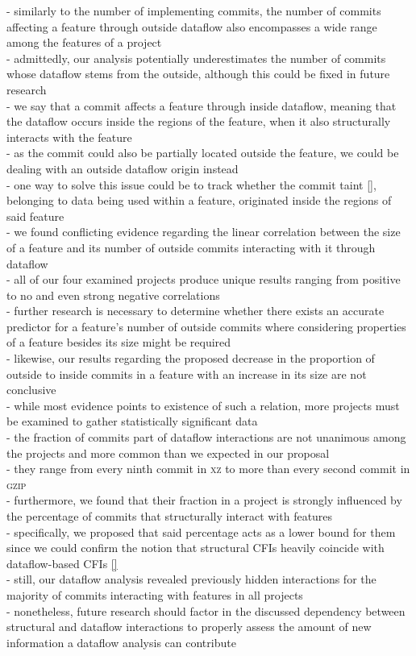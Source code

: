 - similarly to the number of implementing commits, the number of commits affecting a feature through outside dataflow also encompasses a wide range among the features of a project \\
- admittedly, our analysis potentially underestimates the number of commits whose dataflow stems from the outside, although this could be fixed in future research \\
- we say that a commit affects a feature through inside dataflow, meaning that the dataflow occurs inside the regions of the feature, when it also structurally interacts with the feature \\
- as the commit could also be partially located outside the feature, we could be dealing with an outside dataflow origin instead \\
- one way to solve this issue could be to track whether the commit taint \ref{}, belonging to data being used within a feature, originated inside the regions of said feature \\
- we found conflicting evidence regarding the linear correlation between the size of a feature and its number of outside commits interacting with it through dataflow \\
- all of our four examined projects produce unique results ranging from positive to no and even strong negative correlations \\
- further research is necessary to determine whether there exists an accurate predictor for a feature's number of outside commits where considering properties of a feature besides its size might be required \\
- likewise, our results regarding the proposed decrease in the proportion of outside to inside commits in a feature with an increase in its size are not conclusive \\
- while most evidence points to existence of such a relation, more projects must be examined to gather statistically significant data \\

- the fraction of commits part of dataflow interactions are not unanimous among the projects and more common than we expected in our proposal \\
- they range from every ninth commit in \textsc{xz} to more than every second commit in \textsc{gzip} \\
- furthermore, we found that their fraction in a project is strongly influenced by the percentage of commits that structurally interact with features \\
- specifically, we proposed that said percentage acts as a lower bound for them since we could confirm the notion that structural CFIs heavily coincide with dataflow-based CFIs \ref{} \\
- still, our dataflow analysis revealed previously hidden interactions for the majority of commits interacting with features in all projects \\
- nonetheless, future research should factor in the discussed dependency between structural and dataflow interactions to properly assess the amount of new information a dataflow analysis can contribute \\

